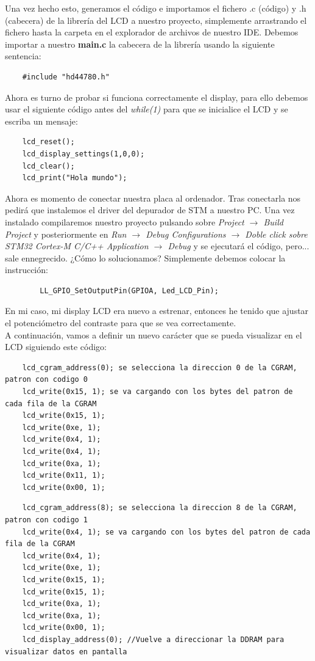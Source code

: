 \documentclass[11pt,a4paper]{article}
\begin{document}
	Una vez hecho esto, generamos el código e importamos el fichero .c (código) y .h (cabecera) de la librería del LCD a nuestro proyecto, simplemente arrastrando el fichero hasta la carpeta en el explorador de archivos de nuestro IDE. Debemos importar a nuestro \textbf{main.c} la cabecera de la librería usando la siguiente sentencia:
	\begin{lstlisting}
	#include "hd44780.h"
	\end{lstlisting}
	
	Ahora es turno de probar si funciona correctamente el display, para ello debemos usar el siguiente código antes del \textit{while(1)} para que se inicialice el LCD y se escriba un mensaje:
	\begin{lstlisting}
	lcd_reset();
	lcd_display_settings(1,0,0);
	lcd_clear();
	lcd_print("Hola mundo");
	\end{lstlisting}
	
	Ahora es momento de conectar nuestra placa al ordenador. Tras conectarla nos pedirá que instalemos el driver del depurador de STM a nuestro PC. Una vez instalado compilaremos nuestro proyecto pulsando sobre \textit{Project $\rightarrow$ Build Project} y posteriormente en \textit{Run $\rightarrow$ Debug Configurations $\rightarrow$ Doble click sobre \textit{STM32 Cortex-M C/C++ Application} $\rightarrow$ \textit{Debug}} y se ejecutará el código, pero... sale ennegrecido. ¿Cómo lo solucionamos? Simplemente debemos colocar la instrucción:
	\begin{lstlisting}
		LL_GPIO_SetOutputPin(GPIOA, Led_LCD_Pin);
	\end{lstlisting}
	
	En mi caso, mi display LCD era nuevo a estrenar, entonces he tenido que ajustar el potenciómetro del contraste para que se vea correctamente.\\
	
	A continuación, vamos a definir un nuevo carácter que se pueda visualizar en el LCD siguiendo este código:
	\begin{lstlisting}
	lcd_cgram_address(0); se selecciona la direccion 0 de la CGRAM, patron con codigo 0
	lcd_write(0x15, 1); se va cargando con los bytes del patron de cada fila de la CGRAM
	lcd_write(0x15, 1);
	lcd_write(0xe, 1);
	lcd_write(0x4, 1);
	lcd_write(0x4, 1);
	lcd_write(0xa, 1);
	lcd_write(0x11, 1);
	lcd_write(0x00, 1);
	\end{lstlisting}
	\begin{lstlisting}
	lcd_cgram_address(8); se selecciona la direccion 8 de la CGRAM, patron con codigo 1
	lcd_write(0x4, 1); se va cargando con los bytes del patron de cada fila de la CGRAM
	lcd_write(0x4, 1);
	lcd_write(0xe, 1);
	lcd_write(0x15, 1);
	lcd_write(0x15, 1);
	lcd_write(0xa, 1);
	lcd_write(0xa, 1);
	lcd_write(0x00, 1);
	lcd_display_address(0); //Vuelve a direccionar la DDRAM para visualizar datos en pantalla
	\end{lstlisting}
	
\end{document}
